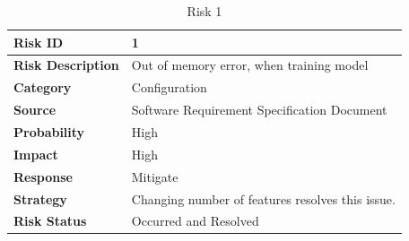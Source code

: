 \documentclass[oneside,a4paper,12pt]{pictreport}
\begin{document}
\begin{table}[h!]
\centering
\caption{Risk 1}
\label{my-label}
\begin{tabular}{|l|l|}
\hline
\textbf{Risk ID}          & 1                                                    \\ \hline
\textbf{Risk Description} & Out of memory error, when training model \\ \hline
\textbf{Category}         & Configuration                                        \\ \hline
\textbf{Source}           & Software Requirement Specification Document          \\ \hline
\textbf{Probability}      & High                                                 \\ \hline
\textbf{Impact}           & High                                                 \\ \hline
\textbf{Response}         & Mitigate                                             \\ \hline
\textbf{Strategy}         & Changing number of features resolves this issue.     \\ \hline
\textbf{Risk Status}      & Occurred and Resolved                                \\ \hline
\end{tabular}
\end{table}
\end{document}
